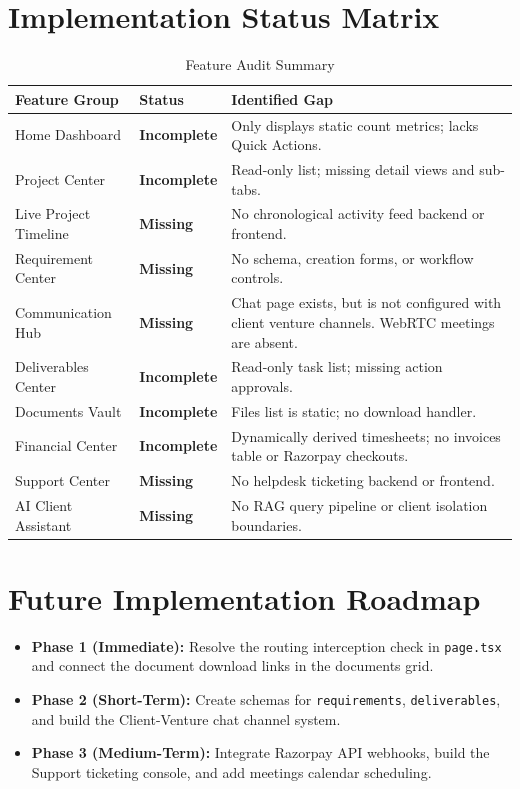 \documentclass[11pt,a4paper]{article}
\begin{document}
\section{Implementation Status Matrix}
\begin{table}[h!]
\centering
\small
{}
\begin{tabularx}{\linewidth}{l X X}
\toprule
\textbf{Feature Group} & \textbf{Status} & \textbf{Identified Gap} \\
\midrule
Home Dashboard & \textcolor{alertorange}{\textbf{Incomplete}} & Only displays static count metrics; lacks Quick Actions. \\
Project Center & \textcolor{alertorange}{\textbf{Incomplete}} & Read-only list; missing detail views and sub-tabs. \\
Live Project Timeline & \textcolor{alertred}{\textbf{Missing}} & No chronological activity feed backend or frontend. \\
Requirement Center & \textcolor{alertred}{\textbf{Missing}} & No schema, creation forms, or workflow controls. \\
Communication Hub & \textcolor{alertred}{\textbf{Missing}} & Chat page exists, but is not configured with client venture channels. WebRTC meetings are absent. \\
Deliverables Center & \textcolor{alertorange}{\textbf{Incomplete}} & Read-only task list; missing action approvals. \\
Documents Vault & \textcolor{alertorange}{\textbf{Incomplete}} & Files list is static; no download handler. \\
Financial Center & \textcolor{alertorange}{\textbf{Incomplete}} & Dynamically derived timesheets; no invoices table or Razorpay checkouts. \\
Support Center & \textcolor{alertred}{\textbf{Missing}} & No helpdesk ticketing backend or frontend. \\
AI Client Assistant & \textcolor{alertred}{\textbf{Missing}} & No RAG query pipeline or client isolation boundaries. \\
\bottomrule
\end{tabularx}
\caption{Feature Audit Summary}
\label{tab:gap_summary}
\end{table}

\section{Future Implementation Roadmap}
\begin{itemize}
    \item \textbf{Phase 1 (Immediate):} Resolve the routing interception check in \texttt{page.tsx} and connect the document download links in the documents grid.
    \item \textbf{Phase 2 (Short-Term):} Create schemas for \texttt{requirements}, \texttt{deliverables}, and build the Client-Venture chat channel system.
    \item \textbf{Phase 3 (Medium-Term):} Integrate Razorpay API webhooks, build the Support ticketing console, and add meetings calendar scheduling.
\end{itemize}
\end{document}
